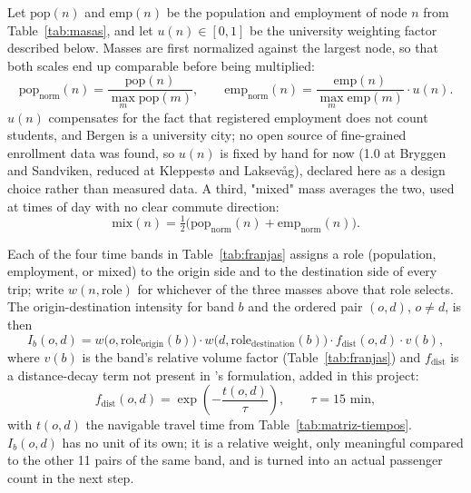 \documentclass[11pt,a4paper]{article}
\begin{document}
Let $\text{pop}(n)$ and $\text{emp}(n)$ be the population and employment of node $n$ from Table~\ref{tab:masas}, and let $u(n) \in [0,1]$ be the university weighting factor described below. Masses are first normalized against the largest node, so that both scales end up comparable before being multiplied:
\begin{equation}
\text{pop}_{\text{norm}}(n) = \frac{\text{pop}(n)}{\max_m \text{pop}(m)}, \qquad
\text{emp}_{\text{norm}}(n) = \frac{\text{emp}(n)}{\max_m \text{emp}(m)} \cdot u(n).
\end{equation}
$u(n)$ compensates for the fact that registered employment does not count students, and Bergen is a university city; no open source of fine-grained enrollment data was found, so $u(n)$ is fixed by hand for now (1.0 at Bryggen and Sandviken, reduced at Kleppestø and Laksevåg), declared here as a design choice rather than measured data. A third, "mixed" mass averages the two, used at times of day with no clear commute direction:
\begin{equation}
\text{mix}(n) = \tfrac{1}{2}\big(\text{pop}_{\text{norm}}(n) + \text{emp}_{\text{norm}}(n)\big).
\end{equation}

Each of the four time bands in Table~\ref{tab:franjas} assigns a role (population, employment, or mixed) to the origin side and to the destination side of every trip; write $w(n, \text{role})$ for whichever of the three masses above that role selects. The origin-destination intensity for band $b$ and the ordered pair $(o,d)$, $o \neq d$, is then
\begin{equation}
\label{eq:intensidad}
I_b(o,d) = w\big(o, \text{role}_{\text{origin}}(b)\big) \cdot w\big(d, \text{role}_{\text{destination}}(b)\big) \cdot f_{\text{dist}}(o,d) \cdot v(b),
\end{equation}
where $v(b)$ is the band's relative volume factor (Table~\ref{tab:franjas}) and $f_{\text{dist}}$ is a distance-decay term not present in \citet{Braathen2024}'s formulation, added in this project:
\begin{equation}
f_{\text{dist}}(o,d) = \exp\!\left(-\frac{t(o,d)}{\tau}\right), \qquad \tau = 15 \text{ min},
\end{equation}
with $t(o,d)$ the navigable travel time from Table~\ref{tab:matriz-tiempos}. $I_b(o,d)$ has no unit of its own; it is a relative weight, only meaningful compared to the other 11 pairs of the same band, and is turned into an actual passenger count in the next step.
\end{document}
